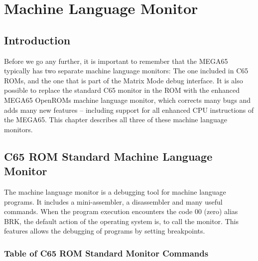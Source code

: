 \chapter{Machine Language Monitor}

\section{Introduction}

Before we go any further, it is important to remember that the MEGA65 typically
has two separate machine language monitors:  The one included in C65 ROMs, and
the one that is part of the Matrix Mode debug interface.  It is also possible to
replace the standard C65 monitor in the ROM with the enhanced MEGA65 OpenROMs
machine language monitor, which corrects many bugs and adds many new features --
including support for all enhanced CPU instructions of the MEGA65.  This chapter
describes all three of these machine language monitors.

\section{C65 ROM Standard Machine Language Monitor}
The machine language monitor is a debugging tool for machine language
programs. It includes a mini-assembler, a disassembler and many useful commands.
When the program execution encounters the code 00 (zero) alias BRK,
the default action of the operating system is, to call the monitor.
This features allows the debugging of programs by setting breakpoints.

\subsection{Table of C65 ROM Standard Monitor Commands}

